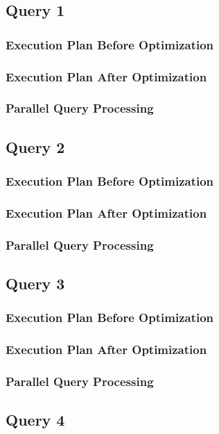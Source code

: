 \subsection{Query 1}
\subsubsection{Execution Plan Before Optimization}
\subsubsection{Execution Plan After Optimization}
\subsubsection{Parallel Query Processing}

\subsection{Query 2}
\subsubsection{Execution Plan Before Optimization}
\subsubsection{Execution Plan After Optimization}
\subsubsection{Parallel Query Processing}

\subsection{Query 3}
\subsubsection{Execution Plan Before Optimization}
\subsubsection{Execution Plan After Optimization}
\subsubsection{Parallel Query Processing}

\subsection{Query 4}

